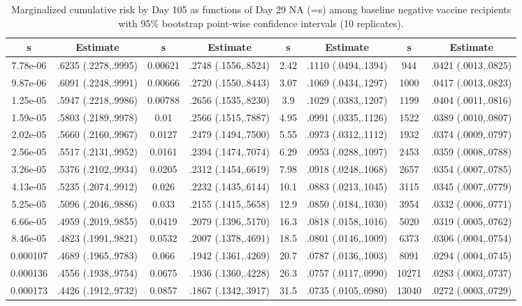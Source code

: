 \begin{longtable}{cccccccc}
\caption{Marginalized cumulative risk by Day 105 as functions of Day 29 NA (=s) among baseline negative vaccine recipients with 95\% bootstrap point-wise confidence intervals (10 replicates).} \\ 
   \hline  s& Estimate& s& Estimate& s& Estimate& s& Estimate\\ 
\hline
7.78e-06 & .6235 (.2278,.9995) & 0.00621 & .2748 (.1556,.8524) & 2.42 & .1110 (.0494,.1394) & 944 & .0421 (.0013,.0825) \\ 
  9.87e-06 & .6091 (.2248,.9991) & 0.00666 & .2720 (.1550,.8443) & 3.07 & .1069 (.0434,.1297) & 1000 & .0417 (.0013,.0823) \\ 
  1.25e-05 & .5947 (.2218,.9986) & 0.00788 & .2656 (.1535,.8230) & 3.9 & .1029 (.0383,.1207) & 1199 & .0404 (.0011,.0816) \\ 
  1.59e-05 & .5803 (.2189,.9978) & 0.01 & .2566 (.1515,.7887) & 4.95 & .0991 (.0335,.1126) & 1522 & .0389 (.0010,.0807) \\ 
  2.02e-05 & .5660 (.2160,.9967) & 0.0127 & .2479 (.1494,.7500) & 5.55 & .0973 (.0312,.1112) & 1932 & .0374 (.0009,.0797) \\ 
  2.56e-05 & .5517 (.2131,.9952) & 0.0161 & .2394 (.1474,.7074) & 6.29 & .0953 (.0288,.1097) & 2453 & .0359 (.0008,.0788) \\ 
  3.26e-05 & .5376 (.2102,.9934) & 0.0205 & .2312 (.1454,.6619) & 7.98 & .0918 (.0248,.1068) & 2657 & .0354 (.0007,.0785) \\ 
  4.13e-05 & .5235 (.2074,.9912) & 0.026 & .2232 (.1435,.6144) & 10.1 & .0883 (.0213,.1045) & 3115 & .0345 (.0007,.0779) \\ 
  5.25e-05 & .5096 (.2046,.9886) & 0.033 & .2155 (.1415,.5658) & 12.9 & .0850 (.0184,.1030) & 3954 & .0332 (.0006,.0771) \\ 
  6.66e-05 & .4959 (.2019,.9855) & 0.0419 & .2079 (.1396,.5170) & 16.3 & .0818 (.0158,.1016) & 5020 & .0319 (.0005,.0762) \\ 
  8.46e-05 & .4823 (.1991,.9821) & 0.0532 & .2007 (.1378,.4691) & 18.5 & .0801 (.0146,.1009) & 6373 & .0306 (.0004,.0754) \\ 
  0.000107 & .4689 (.1965,.9783) & 0.066 & .1942 (.1361,.4269) & 20.7 & .0787 (.0136,.1003) & 8091 & .0294 (.0004,.0745) \\ 
  0.000136 & .4556 (.1938,.9754) & 0.0675 & .1936 (.1360,.4228) & 26.3 & .0757 (.0117,.0990) & 10271 & .0283 (.0003,.0737) \\ 
  0.000173 & .4426 (.1912,.9732) & 0.0857 & .1867 (.1342,.3917) & 31.5 & .0735 (.0105,.0980) & 13040 & .0272 (.0003,.0729) \\ 

\end{longtable}
